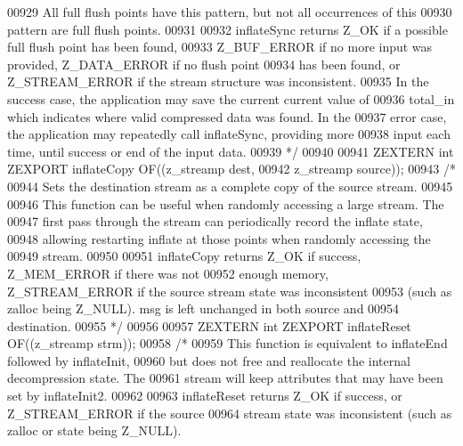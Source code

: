 \begin{DoxyCode}
00929 \textcolor{comment}{   All full flush points have this pattern, but not all occurrences of this}
00930 \textcolor{comment}{   pattern are full flush points.}
00931 \textcolor{comment}{}
00932 \textcolor{comment}{     inflateSync returns Z\_OK if a possible full flush point has been found,}
00933 \textcolor{comment}{   Z\_BUF\_ERROR if no more input was provided, Z\_DATA\_ERROR if no flush point}
00934 \textcolor{comment}{   has been found, or Z\_STREAM\_ERROR if the stream structure was inconsistent.}
00935 \textcolor{comment}{   In the success case, the application may save the current current value of}
00936 \textcolor{comment}{   total\_in which indicates where valid compressed data was found.  In the}
00937 \textcolor{comment}{   error case, the application may repeatedly call inflateSync, providing more}
00938 \textcolor{comment}{   input each time, until success or end of the input data.}
00939 \textcolor{comment}{*/}
00940 
00941 ZEXTERN \textcolor{keywordtype}{int} ZEXPORT inflateCopy OF((z\_streamp dest,
00942                                     z\_streamp source));
00943 \textcolor{comment}{/*}
00944 \textcolor{comment}{     Sets the destination stream as a complete copy of the source stream.}
00945 \textcolor{comment}{}
00946 \textcolor{comment}{     This function can be useful when randomly accessing a large stream.  The}
00947 \textcolor{comment}{   first pass through the stream can periodically record the inflate state,}
00948 \textcolor{comment}{   allowing restarting inflate at those points when randomly accessing the}
00949 \textcolor{comment}{   stream.}
00950 \textcolor{comment}{}
00951 \textcolor{comment}{     inflateCopy returns Z\_OK if success, Z\_MEM\_ERROR if there was not}
00952 \textcolor{comment}{   enough memory, Z\_STREAM\_ERROR if the source stream state was inconsistent}
00953 \textcolor{comment}{   (such as zalloc being Z\_NULL).  msg is left unchanged in both source and}
00954 \textcolor{comment}{   destination.}
00955 \textcolor{comment}{*/}
00956 
00957 ZEXTERN \textcolor{keywordtype}{int} ZEXPORT inflateReset OF((z\_streamp strm));
00958 \textcolor{comment}{/*}
00959 \textcolor{comment}{     This function is equivalent to inflateEnd followed by inflateInit,}
00960 \textcolor{comment}{   but does not free and reallocate the internal decompression state.  The}
00961 \textcolor{comment}{   stream will keep attributes that may have been set by inflateInit2.}
00962 \textcolor{comment}{}
00963 \textcolor{comment}{     inflateReset returns Z\_OK if success, or Z\_STREAM\_ERROR if the source}
00964 \textcolor{comment}{   stream state was inconsistent (such as zalloc or state being Z\_NULL).}

\end{DoxyCode}
